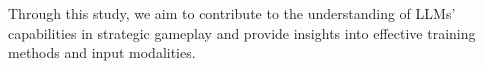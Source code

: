 \documentclass[12pt, twoside]{article}
\begin{document}
Through this study, we aim to contribute to the understanding of LLMs' capabilities in strategic gameplay and provide insights into effective training methods and input modalities.
%
%
%
%
%
%
\end{document}
